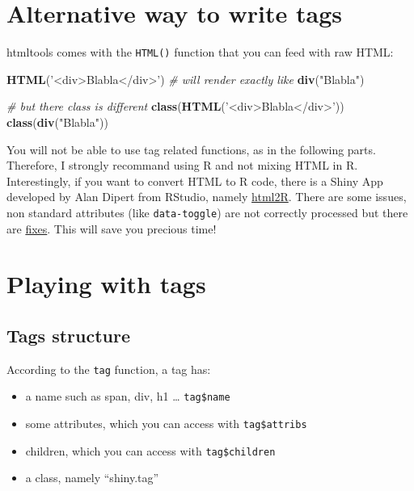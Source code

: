 \documentclass[]{book}
\newenvironment{Shaded}{\begin{snugshade}}{\end{snugshade}}
\newcommand{\CommentTok}[1]{\textcolor[rgb]{0.56,0.35,0.01}{\textit{#1}}}
\newcommand{\KeywordTok}[1]{\textcolor[rgb]{0.13,0.29,0.53}{\textbf{#1}}}
\newcommand{\NormalTok}[1]{#1}
\newcommand{\StringTok}[1]{\textcolor[rgb]{0.31,0.60,0.02}{#1}}
\providecommand{\tightlist}{%
  \setlength{\itemsep}{0pt}\setlength{\parskip}{0pt}}
\begin{document}
\hypertarget{alternative-way-to-write-tags}{%
\section{Alternative way to write tags}\label{alternative-way-to-write-tags}}

htmltools comes with the \texttt{HTML()} function that you can feed with raw HTML:

\begin{Shaded}
\begin{Highlighting}[]
\KeywordTok{HTML}\NormalTok{(}\StringTok{'<div>Blabla</div>'}\NormalTok{)}
\CommentTok{# will render exactly like}
\KeywordTok{div}\NormalTok{(}\StringTok{"Blabla"}\NormalTok{)}

\CommentTok{# but there class is different}
\KeywordTok{class}\NormalTok{(}\KeywordTok{HTML}\NormalTok{(}\StringTok{'<div>Blabla</div>'}\NormalTok{))}
\KeywordTok{class}\NormalTok{(}\KeywordTok{div}\NormalTok{(}\StringTok{"Blabla"}\NormalTok{))}
\end{Highlighting}
\end{Shaded}

You will not be able to use tag related functions, as in the following parts.
Therefore, I strongly recommand using R and not mixing HTML in R. Interestingly, if
you want to convert HTML to R code, there is a Shiny App developed by Alan
Dipert from RStudio, namely \href{https://github.com/alandipert/html2r}{html2R}. There
are some issues, non standard attributes (like \texttt{data-toggle}) are not correctly processed but there are \href{https://github.com/alandipert/html2r/issues/2}{fixes}. This will save you precious time!

\hypertarget{playing-with-tags}{%
\section{Playing with tags}\label{playing-with-tags}}

\hypertarget{tags-structure}{%
\subsection{Tags structure}\label{tags-structure}}

According to the \texttt{tag} function, a tag has:

\begin{itemize}
\tightlist
\item
  a name such as span, div, h1 \ldots{} \texttt{tag\$name}
\item
  some attributes, which you can access with \texttt{tag\$attribs}
\item
  children, which you can access with \texttt{tag\$children}
\item
  a class, namely ``shiny.tag''
\end{itemize}
\end{document}
